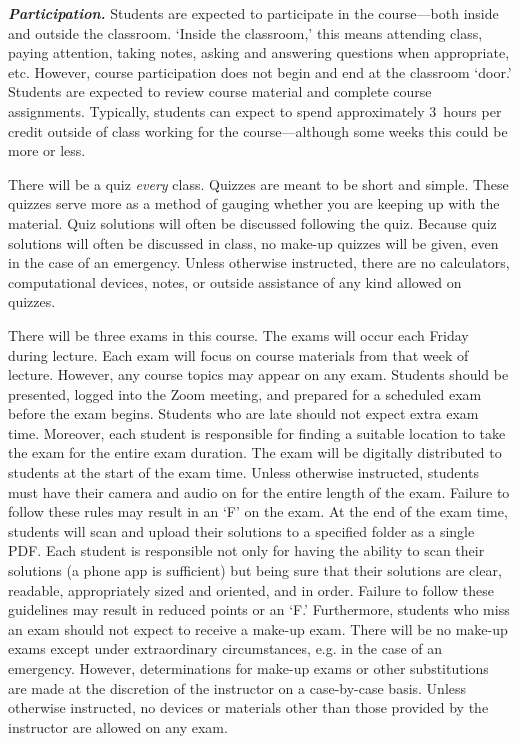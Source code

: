 \documentclass[11pt,letterpaper]{article}
\begin{document}
{\itshape\bfseries\color{stacred}Participation.} 
Students are expected to participate in the course---both inside and outside the classroom. `Inside the classroom,' this means attending class, paying attention, taking notes, asking and answering questions when appropriate, etc. However, course participation does not begin and end at the classroom `door.' Students are expected to review course material and complete course assignments. Typically, students can expect to spend approximately 3~hours per credit outside of class working for the course---although some weeks this could be more or less. 
\sectionbreak





\newpage





There will be a quiz \textit{every} class. Quizzes are meant to be short and simple. These quizzes serve more as a method of gauging whether you are keeping up with the material. Quiz solutions will often be discussed following the quiz. Because quiz solutions will often be discussed in class, no make-up quizzes will be given, even in the case of an emergency. Unless otherwise instructed, there are no calculators, computational devices, notes, or outside assistance of any kind allowed on quizzes. 
\sectionbreak



There will be three exams in this course. The exams will occur each Friday during lecture. Each exam will focus on course materials from that week of lecture. However, any course topics may appear on any exam. Students should be presented, logged into the Zoom meeting, and prepared for a scheduled exam before the exam begins. Students who are late should not expect extra exam time. Moreover, each student is responsible for finding a suitable location to take the exam for the entire exam duration. The exam will be digitally distributed to students at the start of the exam time. Unless otherwise instructed, students must have their camera and audio on for the entire length of the exam. Failure to follow these rules may result in an `F' on the exam. At the end of the exam time, students will scan and upload their solutions to a specified folder as a single PDF. Each student is responsible not only for having the ability to scan their solutions (a phone app is sufficient) but being sure that their solutions are clear, readable, appropriately sized and oriented, and in order. Failure to follow these guidelines may result in reduced points or an `F.' Furthermore, students who miss an exam should not expect to receive a make-up exam. There will be no make-up exams except under extraordinary circumstances, e.g. in the case of an emergency. However, determinations for make-up exams or other substitutions are made at the discretion of the instructor on a case-by-case basis. Unless otherwise instructed, no devices or materials other than those provided by the instructor are allowed on any exam. 
\sectionbreak
\end{document}
